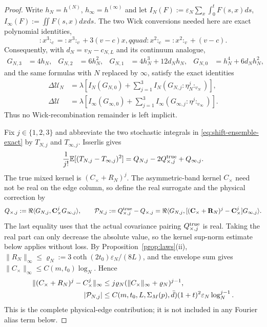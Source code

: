 \documentclass[11pt,a4paper]{article}
\theoremstyle{plain}
\theoremstyle{definition}
\newcommand{\E}{\mathbb{E}}
\newcommand{\eps}{\varepsilon}
\newcommand{\U}{\mathcal U}
\newcommand{\ip}[2]{\langle #1,#2\rangle}
\DeclareMathOperator{\cth}{coth}
\begin{document}
\begin{proof}
Write $h_N=h^{(N)}$, $h_\infty=h^{(\infty)}$ and let
$I_N(F):=\eps_N\sum_x\int_0^tF(s,x)ds$, $I_\infty(F):=\iint F(s,x)dxds$.
The two Wick conversions needed here are exact polynomial identities,
\[
 {:}x^3{:}_{c}={:}x^3{:}_{v}+3(v-c)x,qquad
 {:}x^2{:}_{c}={:}x^2{:}_{v}+(v-c).
\]
Consequently, with $d_N=v_N-c_{N,L}$ and its continuum analogue,
\begin{align*}
 G_{N,3}&=4h_N,&
 G_{N,2}&=6h_N^2,&
 G_{N,1}&=4h_N^3+12d_Nh_N,&
 G_{N,0}&=h_N^4+6d_Nh_N^2,
\end{align*}
and the same formulas with $N$ replaced by $\infty$, satisfy the exact identities
\begin{equation}
 \begin{aligned}
 \Delta\U_N&=\lambda\left[I_N(G_{N,0})+
   \sum_{j=1}^3I_N(G_{N,j}{:}\eta_N^j{:}_{v_N})\right],\\
 \Delta\U&=\lambda\left[I_\infty(G_{\infty,0})+
   \sum_{j=1}^3I_\infty(G_{\infty,j}{:}\eta^j{:}_{v_\infty})\right].
 \end{aligned}
 \label{eq:shift-ensemble-exact}
\end{equation}
Thus no Wick-recombination remainder is left implicit.

Fix $j\in\{1,2,3\}$ and abbreviate the two stochastic integrals in
\eqref{eq:shift-ensemble-exact} by $T_{N,j}$ and $T_{\infty,j}$.  Isserlis gives
\begin{equation}
 \frac1{j!}\E[(T_{N,j}-T_{\infty,j})^2]
 =Q_{N,j}-2Q_{\times,j}^{\rm true}+Q_{\infty,j}.                  \label{eq:shift-Qtrue}
\end{equation}
The true mixed kernel is $(C_\times+R_N)^j$.  The asymmetric-band kernel
$C_\times$ need not be real on the edge column, so define the real surrogate
and the physical correction by
\[
 Q_{\times,j}:=\Re\ip{G_{N,j}}{\mathbf C_\times^jG_{\infty,j}},
 \qquad
 \mathcal P_{N,j}:=Q_{\times,j}^{\rm true}-Q_{\times,j}
 =\Re\ip{G_{N,j}}{[(\mathbf C_\times+\mathbf R_N)^j-
                   \mathbf C_\times^j]G_{\infty,j}}.
\]
The last equality uses that the actual covariance pairing
$Q_{\times,j}^{\rm true}$ is real.  Taking the real part can only decrease
the absolute value, so the kernel sup-norm estimate below applies without loss.
By Proposition~\ref{prop:laws}(ii),
$\|R_N\|_\infty\le\varrho_N:=3\cth(2t_0)\eps_N/(8L)$, and the envelope
sum gives $\|C_\times\|_\infty\le C(m,t_0)\log_N$.  Hence
\begin{align}
 \|(C_\times+R_N)^j-C_\times^j\|_\infty
 &\le j\varrho_N(\|C_\times\|_\infty+\varrho_N)^{j-1},\notag\\
 |\mathcal P_{N,j}|
 &\le C(m,t_0,L,\Sigma_M(p),\bar d)(1+t)^2
          \eps_N\log_N^{j-1}.                                   \label{eq:physical-edge-shift}
\end{align}
This is the complete physical-edge contribution; it is not included in any Fourier
alias term below.


\end{proof}
\end{document}
